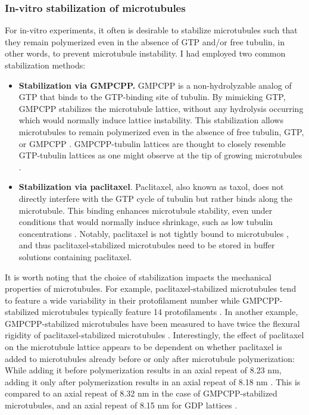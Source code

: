 \subsubsection{In-vitro stabilization of microtubules}
\label{sec:stabilization}
For in-vitro experiments, it often is desirable to stabilize microtubules such that they remain polymerized even in the absence of GTP and/or free tubulin, in other words, to prevent microtubule instability. I had employed two common stabilization methods:
\begin{itemize}
	\item \textbf{Stabilization via GMPCPP.} GMPCPP is a non-hydrolyzable analog of GTP that binds to the GTP-binding site of tubulin. By mimicking GTP, GMPCPP stabilizes the microtubule lattice, without any hydrolysis occurring which would normally induce lattice instability. This stabilization allows microtubules to remain polymerized even in the absence of free tubulin, GTP, or GMPCPP \parencite{Hyman1992}. GMPCPP-tubulin lattices are thought to closely resemble GTP-tubulin lattices as one might observe at the tip of growing microtubules .
	\item \textbf{Stabilization via paclitaxel}. Paclitaxel, also known as taxol, does not directly interfere with the GTP cycle of tubulin but rather binds along the microtubule. This binding enhances microtubule stability, even under conditions that would normally induce shrinkage, such as low tubulin concentrations \parencite{SCHIFF1979}. Notably, paclitaxel is not tightly bound to microtubules , and thus paclitaxel-stabilized microtubules need to be stored in buffer solutions containing paclitaxel.
\end{itemize}
It is worth noting that the choice of stabilization impacts the mechanical properties of microtubules. For example, paclitaxel-stabilized microtubules tend to feature a wide variability in their protofilament number while GMPCPP-stabilized microtubules typically feature 14 protofilaments . In another example, GMPCPP-stabilized microtubules have been measured to have twice the flexural rigidity of paclitaxel-stabilized microtubules . Interestingly, the effect of paclitaxel on the microtubule lattice appears to be dependent on whether paclitaxel is added to microtubules already before or only after microtubule polymerization: While adding it before polymerization results in an axial repeat of 8.23 nm, adding it only after polymerization results in an axial repeat of 8.18 nm . This is compared to an axial repeat of 8.32 nm in the case of GMPCPP-stabilized microtubules, and an axial repeat of 8.15 nm for GDP lattices . \par

